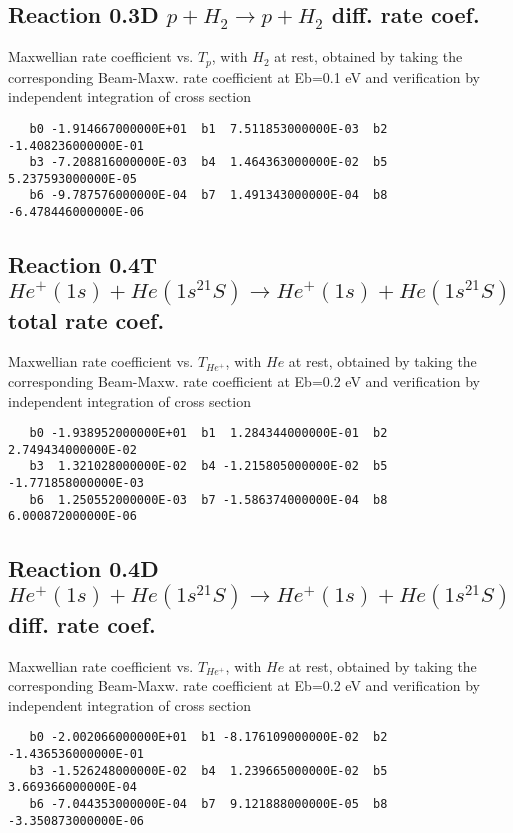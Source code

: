 \documentclass[12pt,dvipdfmx]{article}
\begin{document}
\subsection{
Reaction 0.3D  $p + H_2 \rightarrow p + H_2$ diff. rate coef.
}
Maxwellian rate coefficient vs. $T_p$, with $H_2$ at rest, obtained by taking
the corresponding Beam-Maxw. rate coefficient at Eb=0.1 eV and
verification by independent integration of cross section
\begin{small}\begin{verbatim}
   b0 -1.914667000000E+01  b1  7.511853000000E-03  b2 -1.408236000000E-01
   b3 -7.208816000000E-03  b4  1.464363000000E-02  b5  5.237593000000E-05
   b6 -9.787576000000E-04  b7  1.491343000000E-04  b8 -6.478446000000E-06
\end{verbatim}\end{small}

\subsection{
Reaction 0.4T  $He^+(1s) + He(1s^21S) \rightarrow He^+(1s) + He(1s^21S)$ total rate coef.
}
Maxwellian rate coefficient vs. $T_{He^+}$, with $He$ at rest, obtained by taking
the corresponding Beam-Maxw. rate coefficient at Eb=0.2 eV and
verification by independent integration of cross section
\begin{small}\begin{verbatim}
   b0 -1.938952000000E+01  b1  1.284344000000E-01  b2  2.749434000000E-02
   b3  1.321028000000E-02  b4 -1.215805000000E-02  b5 -1.771858000000E-03
   b6  1.250552000000E-03  b7 -1.586374000000E-04  b8  6.000872000000E-06
\end{verbatim}\end{small}


\subsection{
Reaction 0.4D  $He^+(1s) + He(1s^21S) \rightarrow He^+(1s) + He(1s^21S)$ diff. rate coef.
}
Maxwellian rate coefficient vs. $T_{He^+}$, with $He$ at rest, obtained by taking
the corresponding Beam-Maxw. rate coefficient at Eb=0.2 eV and
verification by independent integration of cross section
\begin{small}\begin{verbatim}
   b0 -2.002066000000E+01  b1 -8.176109000000E-02  b2 -1.436536000000E-01
   b3 -1.526248000000E-02  b4  1.239665000000E-02  b5  3.669366000000E-04
   b6 -7.044353000000E-04  b7  9.121888000000E-05  b8 -3.350873000000E-06
\end{verbatim}\end{small}
\end{document}
